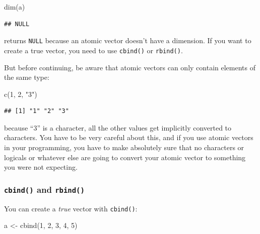 \documentclass[
]{article}
\newenvironment{Shaded}{\begin{snugshade}}{\end{snugshade}}
\newcommand{\DecValTok}[1]{\textcolor[rgb]{0.00,0.00,0.81}{#1}}
\newcommand{\FunctionTok}[1]{\textcolor[rgb]{0.00,0.00,0.00}{#1}}
\newcommand{\NormalTok}[1]{#1}
\newcommand{\OtherTok}[1]{\textcolor[rgb]{0.56,0.35,0.01}{#1}}
\newcommand{\StringTok}[1]{\textcolor[rgb]{0.31,0.60,0.02}{#1}}
\begin{document}
\begin{Shaded}
\begin{Highlighting}[]
\FunctionTok{dim}\NormalTok{(a)}
\end{Highlighting}
\end{Shaded}

\begin{verbatim}
## NULL
\end{verbatim}

returns \texttt{NULL} because an atomic vector doesn't have a dimension.
If you want to create a true vector, you need to use \texttt{cbind()} or \texttt{rbind()}.

But before continuing, be aware that atomic vectors can only contain elements of the same type:

\begin{Shaded}
\begin{Highlighting}[]
\FunctionTok{c}\NormalTok{(}\DecValTok{1}\NormalTok{, }\DecValTok{2}\NormalTok{, }\StringTok{"3"}\NormalTok{)}
\end{Highlighting}
\end{Shaded}

\begin{verbatim}
## [1] "1" "2" "3"
\end{verbatim}

because ``3'' is a character, all the other values get implicitly converted to characters. You have
to be very careful about this, and if you use atomic vectors in your programming, you have to make
absolutely sure that no characters or logicals or whatever else are going to convert your atomic
vector to something you were not expecting.

\hypertarget{cbind-and-rbind}{%
\subsubsection{\texorpdfstring{\texttt{cbind()} and \texttt{rbind()}}{cbind() and rbind()}}\label{cbind-and-rbind}}

You can create a \emph{true} vector with \texttt{cbind()}:

\begin{Shaded}
\begin{Highlighting}[]
\NormalTok{a }\OtherTok{\textless{}{-}} \FunctionTok{cbind}\NormalTok{(}\DecValTok{1}\NormalTok{, }\DecValTok{2}\NormalTok{, }\DecValTok{3}\NormalTok{, }\DecValTok{4}\NormalTok{, }\DecValTok{5}\NormalTok{)}
\end{Highlighting}
\end{Shaded}
\end{document}
